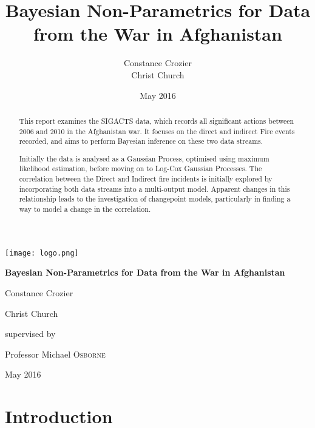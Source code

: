 \documentclass[a4paper,11pt]{report}
\author{{\LARGE Constance Crozier}\\ Christ Church }
\title{{\Huge \textbf{Bayesian Non-Parametrics for Data from the War in Afghanistan}}}
\date{May 2016}
\begin{document}
\begin{titlepage}
	\centering
	\texttt{[image: logo.png]}\par\vspace{1cm}
	\vspace{1cm}
	{\Huge\bfseries Bayesian Non-Parametrics for Data from the War in Afghanistan\par}
	\vspace{2cm}
	{\Large Constance Crozier\par}
	\vspace{1cm}
	{\large Christ Church\par}
	\vfill
	{\small supervised by\par}
	Professor Michael \textsc{Osborne}

	\vfill

	{\large May 2016\par}
\end{titlepage}



\begin{abstract}
This report examines the SIGACTS data, which records all significant actions between 2006 and 2010 in the Afghanistan war. It focuses on the direct and indirect Fire events recorded, and aims to perform Bayesian inference on these two data streams. 

Initially the data is analysed as a Gaussian Process, optimised using maximum likelihood estimation, before moving on to Log-Cox Gaussian Processes. The correlation between the Direct and Indirect fire incidents is initially explored by incorporating both data streams into a multi-output model. Apparent changes in this relationship leads to the investigation of changepoint models, particularly in finding a way to model a change in the correlation. 

\end{abstract}

\singlespacing
\pagestyle{plain}
\tableofcontents
\doublespacing

\pagebreak

\chapter{Introduction}
\end{document}
